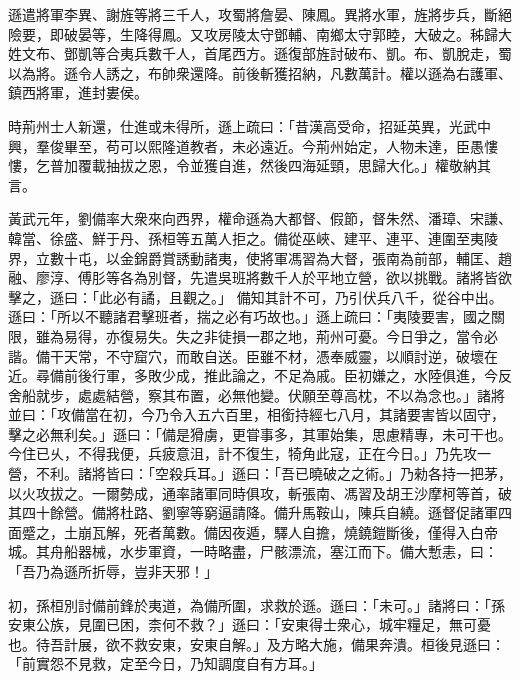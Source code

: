 \begin{pinyinscope}
 
遜遣將軍李異、謝旌等將三千人，攻蜀將詹晏、陳鳳。異將水軍，旌將步兵，斷絕險要，即破晏等，生降得鳳。又攻房陵太守鄧輔、南鄉太守郭睦，大破之。秭歸大姓文布、鄧凱等合夷兵數千人，首尾西方。遜復部旌討破布、凱。布、凱脫走，蜀以為將。遜令人誘之，布帥衆還降。前後斬獲招納，凡數萬計。權以遜為右護軍、鎮西將軍，進封婁侯。
 
 
 
 
 時荊州士人新還，仕進或未得所，遜上疏曰：「昔漢高受命，招延英異，光武中興，羣俊畢至，苟可以熙隆道教者，未必遠近。今荊州始定，人物未達，臣愚慺慺，乞普加覆載抽拔之恩，令並獲自進，然後四海延頸，思歸大化。」權敬納其言。
 
 
黃武元年，劉備率大衆來向西界，權命遜為大都督、假節，督朱然、潘璋、宋謙、韓當、徐盛、鮮于丹、孫桓等五萬人拒之。備從巫峽、建平、連平、連圍至夷陵界，立數十屯，以金錦爵賞誘動諸夷，使將軍馮習為大督，張南為前部，輔匡、趙融、廖淳、傅肜等各為別督，先遣吳班將數千人於平地立營，欲以挑戰。諸將皆欲擊之，遜曰：「此必有譎，且觀之。」
 備知其計不可，乃引伏兵八千，從谷中出。遜曰：「所以不聽諸君擊班者，揣之必有巧故也。」遜上疏曰：「夷陵要害，國之關限，雖為易得，亦復易失。失之非徒損一郡之地，荊州可憂。今日爭之，當令必諧。備干天常，不守窟穴，而敢自送。臣雖不材，憑奉威靈，以順討逆，破壞在近。尋備前後行軍，多敗少成，推此論之，不足為戚。臣初嫌之，水陸俱進，今反舍船就步，處處結營，察其布置，必無他變。伏願至尊高枕，不以為念也。」諸將並曰：「攻備當在初，今乃令入五六百里，相銜持經七八月，其諸要害皆以固守，擊之必無利矣。」遜曰：「備是猾虜，更甞事多，其軍始集，思慮精專，未可干也。今住已乆，不得我便，兵疲意沮，計不復生，犄角此寇，正在今日。」乃先攻一營，不利。諸將皆曰：「空殺兵耳。」遜曰：「吾已曉破之之術。」乃勑各持一把茅，以火攻拔之。一爾勢成，通率諸軍同時俱攻，斬張南、馮習及胡王沙摩柯等首，破其四十餘營。備將杜路、劉寧等窮逼請降。備升馬鞍山，陳兵自繞。遜督促諸軍四面蹙之，土崩瓦解，死者萬數。備因夜遁，驛人自擔，燒鐃鎧斷後，僅得入白帝城。其舟船器械，水步軍資，一時略盡，尸骸漂流，塞江而下。備大慙恚，曰：「吾乃為遜所折辱，豈非天邪！」
 
 
 
 
 初，孫桓別討備前鋒於夷道，為備所圍，求救於遜。遜曰：「未可。」諸將曰：「孫安東公族，見圍已困，柰何不救？」遜曰：「安東得士衆心，城牢糧足，無可憂也。待吾計展，欲不救安東，安東自解。」及方略大施，備果奔潰。桓後見遜曰：「前實怨不見救，定至今日，乃知調度自有方耳。」
 

\end{pinyinscope}
